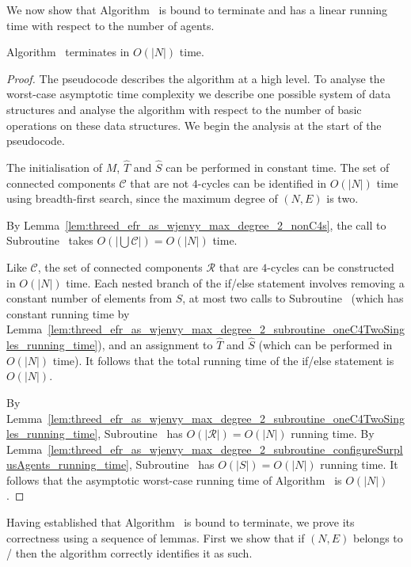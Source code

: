 We now show that Algorithm~ is bound to terminate and has a linear running time with respect to the number of agents.

\begin{lem}
\label{lem:threed_efr_as_wjenvy_max_degree_2_algo_valid_runningtime}
Algorithm~ terminates in $O(|N|)$ time.
\end{lem}
\begin{proof}
The pseudocode describes the algorithm at a high level. To analyse the worst-case asymptotic time complexity we describe one possible system of data structures and analyse the algorithm with respect to the number of basic operations on these data structures. We begin the analysis at the start of the pseudocode.

The initialisation of $M$, $\hat{T}$ and $\hat{S}$ can be performed in constant time. The set of connected components $\mathcal{C}$ that are not $4$-cycles can be identified in $O(|N|)$ time using breadth-first search, since the maximum degree of $(N, E)$ is two.

By Lemma~\ref{lem:threed_efr_as_wjenvy_max_degree_2_nonC4s}, the call to Subroutine~ takes $O(|\bigcup \mathcal{C}|) = O(|N|)$ time.

Like $\mathcal{C}$, the set of connected components $\mathcal{R}$ that are $4$-cycles can be constructed in $O(|N|)$ time. Each nested branch of the if/else statement involves removing a constant number of elements from $S$, at most two calls to Subroutine~ (which has constant running time by Lemma~\ref{lem:threed_efr_as_wjenvy_max_degree_2_subroutine_oneC4TwoSingles_running_time}), and an assignment to $\hat{T}$ and $\hat{S}$ (which can be performed in $O(|N|)$ time). It follows that the total running time of the if/else statement is $O(|N|)$.

By Lemma~\ref{lem:threed_efr_as_wjenvy_max_degree_2_subroutine_oneC4TwoSingles_running_time}, Subroutine~ has $O(|\mathcal{R}|) = O(|N|)$ running time. By Lemma~\ref{lem:threed_efr_as_wjenvy_max_degree_2_subroutine_configureSurplusAgents_running_time}, Subroutine~ has $O(|S|) = O(|N|)$ running time. It follows that the asymptotic worst-case running time of Algorithm~ is $O(|N|)$.
\end{proof}

Having established that Algorithm~ is bound to terminate, we prove its correctness using a sequence of lemmas. First we show that if $(N, E)$ belongs to \iwjnomaxdegreetwofamily/ then the algorithm correctly identifies it as such.

